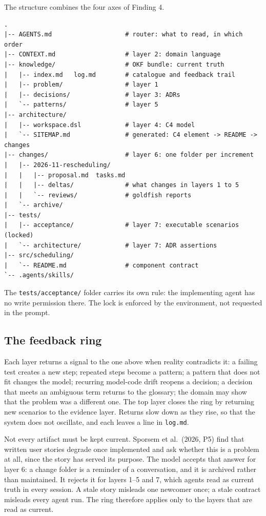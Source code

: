 \documentclass[11pt]{article}
\begin{document}
The structure combines the four axes of Finding 4.

\begin{verbatim}
.
|-- AGENTS.md                    # router: what to read, in which order
|-- CONTEXT.md                   # layer 2: domain language
|-- knowledge/                   # OKF bundle: current truth
|   |-- index.md   log.md        # catalogue and feedback trail
|   |-- problem/                 # layer 1
|   |-- decisions/               # layer 3: ADRs
|   `-- patterns/                # layer 5
|-- architecture/
|   |-- workspace.dsl            # layer 4: C4 model
|   `-- SITEMAP.md               # generated: C4 element -> README -> changes
|-- changes/                     # layer 6: one folder per increment
|   |-- 2026-11-rescheduling/
|   |   |-- proposal.md  tasks.md
|   |   |-- deltas/              # what changes in layers 1 to 5
|   |   `-- reviews/             # goldfish reports
|   `-- archive/
|-- tests/
|   |-- acceptance/              # layer 7: executable scenarios (locked)
|   `-- architecture/            # layer 7: ADR assertions
|-- src/scheduling/
|   `-- README.md                # component contract
`-- .agents/skills/
\end{verbatim}

The \texttt{tests/acceptance/} folder carries its own rule: the implementing agent has no write permission there. The lock is enforced by the environment, not requested in the prompt.

\subsection{The feedback ring}

Each layer returns a signal to the one above when reality contradicts it: a failing test creates a new step; repeated steps become a pattern; a pattern that does not fit changes the model; recurring model-code drift reopens a decision; a decision that meets an ambiguous term returns to the glossary; the domain may show that the problem was a different one. The top layer closes the ring by returning new scenarios to the evidence layer. Returns slow down as they rise, so that the system does not oscillate, and each leaves a line in \texttt{log.md}.

Not every artifact must be kept current. Sporsem et al.\ (2026, P5) find that written user stories degrade once implemented and ask whether this is a problem at all, since the story has served its purpose. The model accepts that answer for layer 6: a change folder is a reminder of a conversation, and it is archived rather than maintained. It rejects it for layers 1--5 and 7, which agents read as current truth in every session. A stale story misleads one newcomer once; a stale contract misleads every agent run. The ring therefore applies only to the layers that are read as current.
\end{document}
